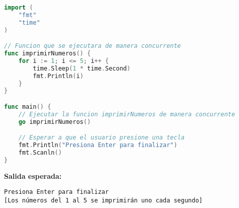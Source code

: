 \documentclass{report}
\begin{document}
\begin{itemize}
\begin{minipage}{\linewidth}
\begin{lstlisting}[language=Go, caption=Ejemplo de Programacion Concurrente en Go]
import (
    "fmt"
    "time"
)

// Funcion que se ejecutara de manera concurrente
func imprimirNumeros() {
    for i := 1; i <= 5; i++ {
        time.Sleep(1 * time.Second)
        fmt.Println(i)
    }
}

func main() {
    // Ejecutar la funcion imprimirNumeros de manera concurrente
    go imprimirNumeros()

    // Esperar a que el usuario presione una tecla
    fmt.Println("Presiona Enter para finalizar")
    fmt.Scanln()
}
\end{lstlisting}

\textbf{Salida esperada:}
\begin{verbatim}
Presiona Enter para finalizar
[Los números del 1 al 5 se imprimirán uno cada segundo]
\end{verbatim}
\end{minipage} %

\end{itemize}
\end{document}
